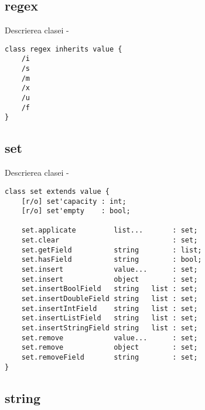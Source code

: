 \subsection{{\color{lightblue} regex}}

\noindent Descrierea clasei \regex -
\begin{verbatim}
class regex inherits value {
    /i
    /s
    /m
    /x
    /u
    /f
}
\end{verbatim}

\subsection{{\color{lightblue} set}}

\noindent Descrierea clasei \set -
\begin{verbatim}
class set extends value {
    [r/o] set'capacity : int;
    [r/o] set'empty    : bool;

    set.applicate         list...       : set;
    set.clear                           : set;
    set.getField          string        : list;
    set.hasField          string        : bool;
    set.insert            value...      : set;
    set.insert            object        : set;
    set.insertBoolField   string   list : set;
    set.insertDoubleField string   list : set;
    set.insertIntField    string   list : set;
    set.insertListField   string   list : set;
    set.insertStringField string   list : set;
    set.remove            value...      : set;
    set.remove            object        : set;
    set.removeField       string        : set;
}
\end{verbatim}

\subsection{{\color{lightblue} string}}


